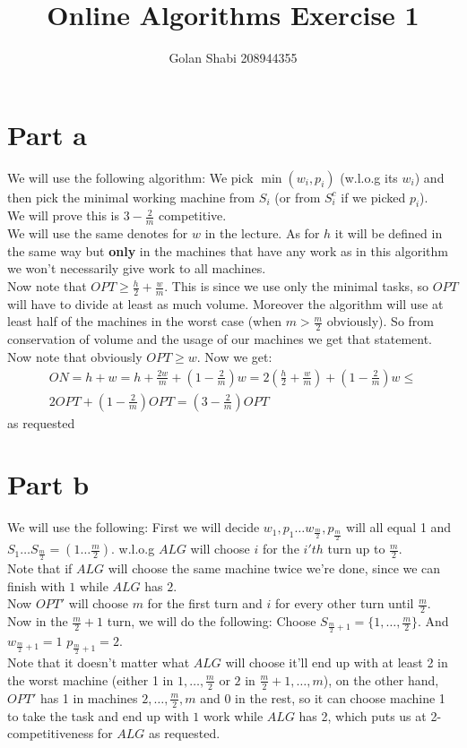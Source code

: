 \documentclass{article}
\title{Online Algorithms Exercise 1}
\author{Golan Shabi 208944355}
\begin{document}
\maketitle
\section{Part a}
We will use the following algorithm:
We pick $\min(w_i,p_i)$ (w.l.o.g its $w_i$) and then pick the minimal working machine from $S_i$ (or from $S_i^c$ if we picked $p_i$).\\
We will prove this is $3-\frac{2}{m}$ competitive.\\
We will use the same denotes for $w$ in the lecture. As for $h$ it will be defined in the same way but \textbf{only} in the machines that have any work as in this algorithm we won't necessarily give work to all machines.\\
Now note that $OPT\geq\frac{h}{2} + \frac{w}{m}$. This is since we use only the minimal tasks, so $OPT$ will have to divide at least as much volume. Moreover the algorithm will use at least half of the machines in the worst case (when $m>\frac{m}{2}$ obviously). So from conservation of volume and the usage of our machines we get that statement.\\
Now note that obviously $OPT\geq w$. Now we get:
\begin{gather*}
    ON = h+w = h+\frac{2w}{m} + (1-\frac{2}{m})w = 2(\frac{h}{2}+\frac{w}{m}) + (1-\frac{2}{m})w \leq\\
    2OPT + (1-\frac{2}{m})OPT = (3-\frac{2}{m})OPT
\end{gather*}
as requested
\pagebreak
\section{Part b}
We will use the following:
First we will decide $w_1,p_1\dots w_{\frac{m}{2}},p_{\frac{m}{2}}$ will all equal 1 and  $S_1\dots S_{\frac{m}{2}}=(1\dots \frac{m}{2})$. w.l.o.g $ALG$ will choose $i$ for the $i'th$ turn up to $\frac{m}{2}$.\\
Note that if $ALG$ will choose the same machine twice we're done, since we can finish with $1$ while $ALG$ has $2$.\\
Now $OPT'$ will choose $m$ for the first turn and $i$ for every other turn until $\frac{m}{2}$.\\
Now in the $\frac{m}{2} + 1$ turn, we will do the following:
Choose $S_{\frac{m}{2} + 1} = \{1,\dots,\frac{m}{2}\}$. And $w_{\frac{m}{2} + 1} = 1$ $p_{\frac{m}{2} + 1}=2$.\\
Note that it doesn't matter what $ALG$ will choose it'll end up with at least 2 in the worst machine (either 1 in $1,\dots,\frac{m}{2}$ or $2$ in $\frac{m}{2}+1,\dots,m$), on the other hand, $OPT'$ has 1 in machines $2,\dots,\frac{m}{2},m$  and 0 in the rest, so it can choose machine 1 to take the task and end up with $1$ work while $ALG$ has 2, which puts us at 2-competitiveness for $ALG$ as requested.
\end{document}
